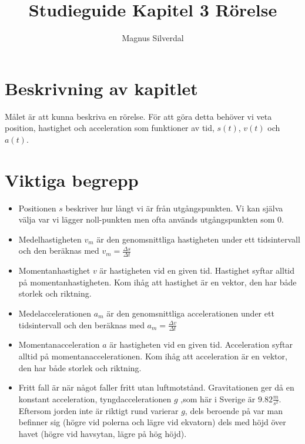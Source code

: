 \documentclass[11pt]{article}
\title{Studieguide Kapitel 3 Rörelse}
\author{Magnus Silverdal}
\begin{document}
    \maketitle
    \section{Beskrivning av kapitlet}
    Målet är att kunna beskriva en rörelse. För att göra detta behöver vi veta position, hastighet och acceleration som
    funktioner av tid, $s(t)$, $v(t)$ och $a(t)$.
    \section{Viktiga begrepp}
    \begin{itemize}
        \item Positionen $s$ beskriver hur långt vi är från utgångspunkten. Vi kan själva välja var vi lägger noll-punkten
        men ofta används utgångspunkten som 0.
        \item Medelhastigheten $v_m$ är den genomsnittliga hastigheten under ett tidsintervall och den beräknas med
        $v_m=\frac{\Delta s}{\Delta t}$
        \item Momentanhastighet $v$ är hastigheten vid en given tid. Hastighet syftar alltid på momentanhastigheten.
        Kom ihåg att hastighet är en vektor, den har både storlek och riktning.
        \item Medelaccelerationen $a_m$ är den genomsnittliga accelerationen under ett tidsintervall och den beräknas med
        $a_m=\frac{\Delta v}{\Delta t}$
        \item Momentanacceleration $a$ är hastigheten vid en given tid. Acceleration syftar alltid på momentanaccelerationen.
        Kom ihåg att acceleration är en vektor, den har både storlek och riktning.
        \item Fritt fall är när något faller fritt utan luftmotstånd. Gravitationen ger då en konstant acceleration,
        tyngdaccelerationen $g$ ,som här i Sverige är $9.82 \frac{m}{s^2}$. Eftersom jorden inte är riktigt rund varierar $g$,
        dels beroende på var man befinner sig (högre vid polerna och lägre vid ekvatorn) dels med höjd över havet (högre vid
        havsytan, lägre på hög höjd).
    \end{itemize}
\end{document}
